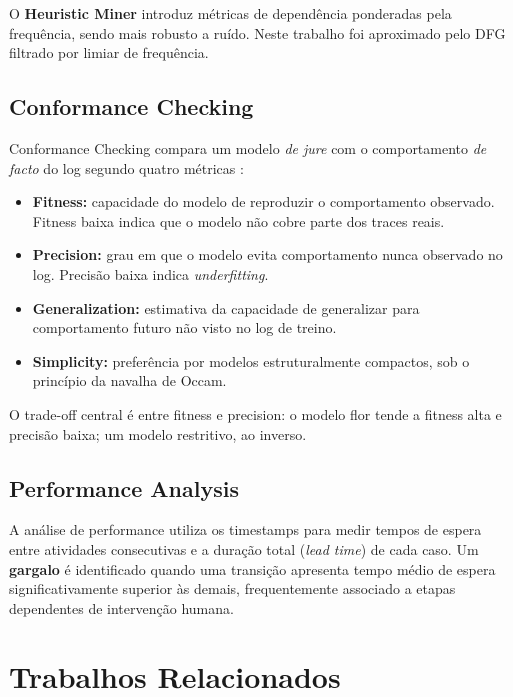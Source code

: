 \documentclass[12pt,a4paper]{article}
\begin{document}
O \textbf{Heuristic Miner} \cite{weijters2011} introduz métricas de dependência ponderadas pela frequência, sendo mais robusto a ruído. Neste trabalho foi aproximado pelo DFG filtrado por limiar de frequência.

\subsection{Conformance Checking}

Conformance Checking compara um modelo \textit{de jure} com o comportamento \textit{de facto} do log segundo quatro métricas \cite{vanderAalst2016}:

\begin{itemize}
  \item \textbf{Fitness:} capacidade do modelo de reproduzir o comportamento observado. Fitness baixa indica que o modelo não cobre parte dos traces reais.
  \item \textbf{Precision:} grau em que o modelo evita comportamento nunca observado no log. Precisão baixa indica \textit{underfitting}.
  \item \textbf{Generalization:} estimativa da capacidade de generalizar para comportamento futuro não visto no log de treino.
  \item \textbf{Simplicity:} preferência por modelos estruturalmente compactos, sob o princípio da navalha de Occam.
\end{itemize}

O trade-off central é entre fitness e precision: o modelo flor tende a fitness alta e precisão baixa; um modelo restritivo, ao inverso.

\subsection{Performance Analysis}

A análise de performance utiliza os timestamps para medir tempos de espera entre atividades consecutivas e a duração total (\textit{lead time}) de cada caso. Um \textbf{gargalo} é identificado quando uma transição apresenta tempo médio de espera significativamente superior às demais, frequentemente associado a etapas dependentes de intervenção humana.

\section{Trabalhos Relacionados}
\end{document}
